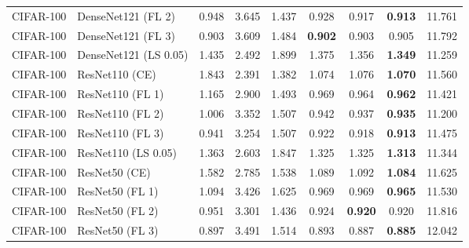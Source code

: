 \begin{table}[h!]
{\begin{tabular}{llccccccc}
   CIFAR-100 &          DenseNet121 (FL 2) &         0.948 &        3.645 &    1.437 &                  0.928 &                  0.917 & \textbf{0.913} &                 11.761 \\
   CIFAR-100 &          DenseNet121 (FL 3) &         0.903 &        3.609 &    1.484 & \textbf{0.902} &                  0.903 &                  0.905 &                 11.792 \\
   CIFAR-100 &       DenseNet121 (LS 0.05) &         1.435 &        2.492 &    1.899 &                  1.375 &                  1.356 & \textbf{1.349} &                 11.259 \\
   CIFAR-100 &              ResNet110 (CE) &         1.843 &        2.391 &    1.382 &                  1.074 &                  1.076 & \textbf{1.070} &                 11.560 \\
   CIFAR-100 &            ResNet110 (FL 1) &         1.165 &        2.900 &    1.493 &                  0.969 &                  0.964 & \textbf{0.962} &                 11.421 \\
   CIFAR-100 &            ResNet110 (FL 2) &         1.006 &        3.352 &    1.507 &                  0.942 &                  0.937 & \textbf{0.935} &                 11.200 \\
   CIFAR-100 &            ResNet110 (FL 3) &         0.941 &        3.254 &    1.507 &                  0.922 &                  0.918 & \textbf{0.913} &                 11.475 \\
   CIFAR-100 &         ResNet110 (LS 0.05) &         1.363 &        2.603 &    1.847 &                  1.325 &                  1.325 & \textbf{1.313} &                 11.344 \\
   CIFAR-100 &               ResNet50 (CE) &         1.582 &        2.785 &    1.538 &                  1.089 &                  1.092 & \textbf{1.084} &                 11.625 \\
   CIFAR-100 &             ResNet50 (FL 1) &         1.094 &        3.426 &    1.625 &                  0.969 &                  0.969 & \textbf{0.965} &                 11.530 \\
   CIFAR-100 &             ResNet50 (FL 2) &         0.951 &        3.301 &    1.436 &                  0.924 & \textbf{0.920} &                  0.920 &                 11.816 \\
   CIFAR-100 &             ResNet50 (FL 3) &         0.897 &        3.491 &    1.514 &                  0.893 &                  0.887 & \textbf{0.885} &                 12.042 \\

\end{tabular}}
\end{table}
